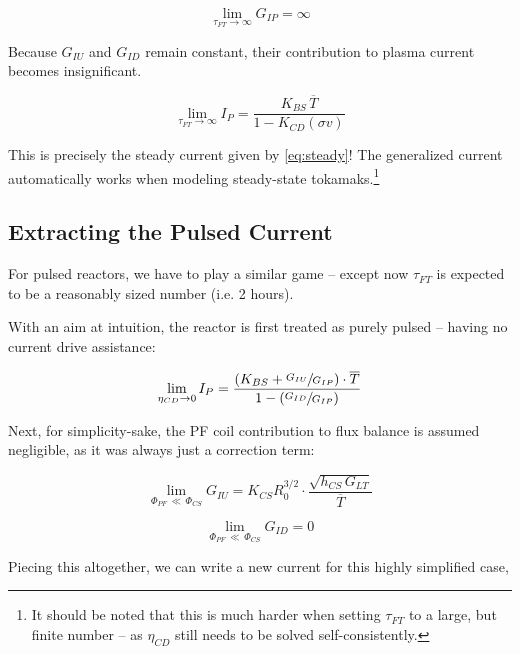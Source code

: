 \begin{equation}
	\lim_{\tau_{FT} \to \infty} G_{IP} = \infty
\end{equation}

Because $G_{IU}$ and $G_{ID}$ remain constant, their contribution to plasma current becomes insignificant.

\begin{equation}
	\label{eq:tau_inf}
	\lim_{\tau_{FT} \to \infty} I_P = \frac{ K_{BS} \, \overline T }{ 1 - K_{CD} ( \sigma v ) }
\end{equation}

This is precisely the steady current given by \cref{eq:steady}! The generalized current automatically works when modeling steady-state tokamaks.\footnote{ It should be noted that this is much harder when setting $\tau_{FT}$ to a large, but finite number -- as $\eta_{CD}$ still needs to be solved self-consistently. }

\subsection{Extracting the Pulsed Current}

For pulsed reactors, we have to play a similar game -- except now $\tau_{FT}$ is expected to be a reasonably sized number (i.e. 2 hours).

With an aim at intuition, the reactor is first treated as purely pulsed -- having no current drive assistance:

\begin{equation}
	\lim_{\eta_{CD} \to 0} I_P = \frac{ \left( K_{BS} + \sfrac{ G_{IU} }{ G_{IP} } \right) \cdot \overline T }{ 1 - \left( \sfrac{ G_{ID} }{ G_{IP} } \right) }
\end{equation}

Next, for simplicity-sake, the PF coil contribution to flux balance is assumed negligible, as it was always just a correction term:

\begin{equation}
	\lim_{ \Phi_{PF} \, \ll \, \Phi_{CS} } G_{IU} = K_{CS} R_0^{3/2} \cdot \frac{ \sqrt{ h_{CS} \, G_{LT} } }{ \overline T }
\end{equation}

\begin{equation}
	\lim_{ \Phi_{PF} \, \ll \, \Phi_{CS} } G_{ID} = 0
\end{equation}

Piecing this altogether, we can write a new current for this highly simplified case, 

